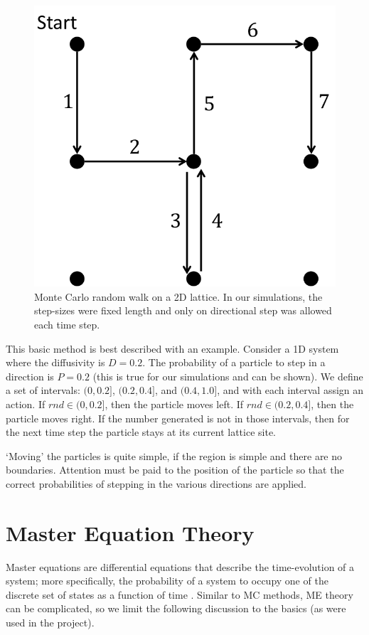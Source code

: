	\begin{figure}[h]
		\centering
		\includegraphics[width=0.5\linewidth]{../images/mc-random-walk}
		\caption[Monte Carlo random walk on a 2D lattice]{Monte Carlo random walk on a 2D lattice. In our simulations, the step-sizes were fixed length and only on directional step was allowed each time step.}
		\label{fig:mc-random-walk}
	\end{figure}

	This basic method is best described with an example. Consider a 1D system where the diffusivity is $ D = 0.2 $. The probability of a particle to step in a direction is $ P = 0.2 $ (this is true for our simulations and can be shown). We define a set of intervals: $ (0,0.2] $, $ (0.2,0.4] $, and $ (0.4,1.0] $, and with each interval assign an action. If $ rnd \in (0,0.2] $, then the particle moves left. If $ rnd \in (0.2,0.4] $, then the particle moves right. If the number generated is not in those intervals, then for the next time step the particle stays at its current lattice site.
	
	`Moving' the particles is quite simple, if the region is simple and there are no boundaries. Attention must be paid to the position of the particle so that the correct probabilities of stepping in the various directions are applied.
	
\section{Master Equation Theory}
\label{sec:intro-me}
	
	Master equations are differential equations that describe the time-evolution of a system; more specifically, the probability of a system to occupy one of the discrete set of states as a function of time \citep{master-equations}. Similar to MC methods, ME theory can be complicated, so we limit the following discussion to the basics (as were used in the project). 
	

